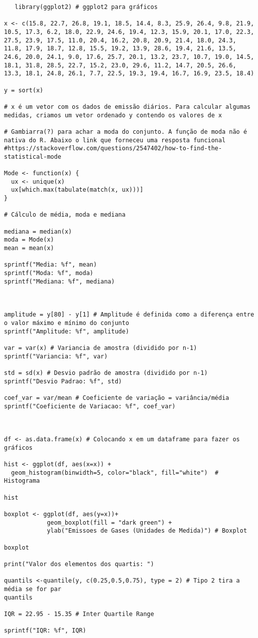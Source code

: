 \documentclass[a4paper,11pt]{article}
\begin{document}
\begin{lstlisting}
   library(ggplot2) # ggplot2 para gráficos

x <- c(15.8, 22.7, 26.8, 19.1, 18.5, 14.4, 8.3, 25.9, 26.4, 9.8, 21.9, 10.5, 17.3, 6.2, 18.0, 22.9, 24.6, 19.4, 12.3, 15.9, 20.1, 17.0, 22.3, 27.5, 23.9, 17.5, 11.0, 20.4, 16.2, 20.8, 20.9, 21.4, 18.0, 24.3, 11.8, 17.9, 18.7, 12.8, 15.5, 19.2, 13.9, 28.6, 19.4, 21.6, 13.5, 24.6, 20.0, 24.1, 9.0, 17.6, 25.7, 20.1, 13.2, 23.7, 10.7, 19.0, 14.5, 18.1, 31.8, 28.5, 22.7, 15.2, 23.0, 29.6, 11.2, 14.7, 20.5, 26.6, 13.3, 18.1, 24.8, 26.1, 7.7, 22.5, 19.3, 19.4, 16.7, 16.9, 23.5, 18.4)

y = sort(x)

# x é um vetor com os dados de emissão diários. Para calcular algumas medidas, criamos um vetor ordenado y contendo os valores de x 

# Gambiarra(?) para achar a moda do conjunto. A função de moda não é nativa do R. Abaixo o link que forneceu uma resposta funcional
#https://stackoverflow.com/questions/2547402/how-to-find-the-statistical-mode

Mode <- function(x) {
  ux <- unique(x)
  ux[which.max(tabulate(match(x, ux)))]
}

# Cálculo de média, moda e mediana

mediana = median(x)
moda = Mode(x)
mean = mean(x)

sprintf("Media: %f", mean)
sprintf("Moda: %f", moda)
sprintf("Mediana: %f", mediana)



amplitude = y[80] - y[1] # Amplitude é definida como a diferença entre o valor máximo e mínimo do conjunto
sprintf("Amplitude: %f", amplitude)

var = var(x) # Variancia de amostra (dividido por n-1)
sprintf("Variancia: %f", var)

std = sd(x) # Desvio padrão de amostra (dividido por n-1)
sprintf("Desvio Padrao: %f", std)

coef_var = var/mean # Coeficiente de variação = variância/média
sprintf("Coeficiente de Variacao: %f", coef_var)



df <- as.data.frame(x) # Colocando x em um dataframe para fazer os gráficos

hist <- ggplot(df, aes(x=x)) + 
  geom_histogram(binwidth=5, color="black", fill="white")  # Histograma

hist

boxplot <- ggplot(df, aes(y=x))+
            geom_boxplot(fill = "dark green") +
            ylab("Emissoes de Gases (Unidades de Medida)") # Boxplot

boxplot

print("Valor dos elementos dos quartis: ")

quantils <-quantile(y, c(0.25,0.5,0.75), type = 2) # Tipo 2 tira a média se for par
quantils

IQR = 22.95 - 15.35 # Inter Quartile Range

sprintf("IQR: %f", IQR)
\end{lstlisting}
\end{document}

